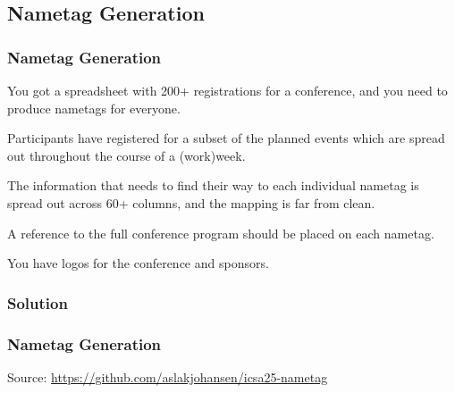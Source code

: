 {\begin{frame}[fragile]
\end{frame}

\subsection{Nametag Generation}
\begin{frame}[fragile]
  \frametitle{Nametag Generation}
  \vspace{3mm}
  You got a spreadsheet with 200+ registrations for a conference, and you need to produce nametags for everyone.
  
  \vspace{5mm}
  Participants have registered for a subset of the planned events which are spread out throughout the course of a (work)week.
  
  \vspace{5mm}
  The information that needs to find their way to each individual nametag is spread out across 60+ columns, and the mapping is far from clean.
  
  \vspace{5mm}
  A reference to the full conference program should be placed on each nametag.
  
  \vspace{5mm}
  You have logos for the conference and sponsors.
\end{frame}

\subsubsection{Solution}
\begin{frame}[fragile]
  \frametitle{Nametag Generation }
  \vspace{3mm}
  
  \vspace{5mm}
  Source: \url{https://github.com/aslakjohansen/icsa25-nametag}
\end{frame}

}
